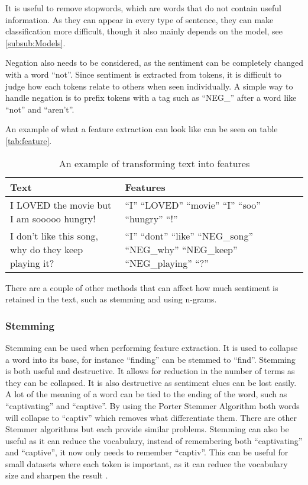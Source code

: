 It is useful to remove stopwords, which are words that do not contain useful
information. As they can appear in every type of sentence, they can make
classification more difficult, though it also mainly depends on the model,
see \autoref{subsub:Models}.\nl

Negation also needs to be considered, as the sentiment can be completely changed
with a word ``not''. Since sentiment is extracted from tokens, it is difficult
to judge how each tokens relate to others when seen individually. A simple way
to handle negation is to prefix tokens with a tag such as ``NEG\_'' after a
word like ``not'' and ``aren't''.\nl

An example of what a feature extraction can look like can be seen on table
\autoref{tab:feature}.

\begin{table}[H]
\centering
\begin{tabular}{|p{6cm}|p{8cm}|}
\hline
Text & Features \\ \hline
I LOVED the movie but I am sooooo hungry! & 
``I'' ``LOVED'' ``movie'' ``I'' ``soo'' ``hungry'' ``!''
\\ \hline 
I don't like this song, why do they keep playing it? &
``I'' ``dont'' ``like'' ``NEG\_song'' ``NEG\_why'' ``NEG\_keep'' ``NEG\_playing''
``?'' \\ \hline
\end{tabular}
\caption{An example of transforming text into features}
\label{tab:feature}
\end{table}

There are a couple of other methods that can affect how much sentiment is
retained in the text, such as stemming and using n-grams.

\subsubsection{Stemming}
Stemming can be used when performing feature extraction. It is used to collapse
a word into its base, for instance ``finding'' can be stemmed to ``find''.
Stemming is both useful and destructive. It allows for reduction in the number
of terms as they can be collapsed. It is also destructive as sentiment clues
can be lost easily. A lot of the meaning of a word can be tied to the ending of
the word, such as ``captivating'' and ``captive''. By using the Porter Stemmer
Algorithm both words will collapse to ``captiv'' which removes what
differentiate them. There are other Stemmer algorithms but each provide similar
problems. Stemming can also be useful as it can reduce the vocabulary, instead
of remembering both ``captivating'' and ``captive'', it now only needs to
remember ``captiv''. This can be useful for small datasets where each token is
important, as it can reduce the vocabulary size and sharpen the result
\citep[Ch 3.b]{Sentiment}.

